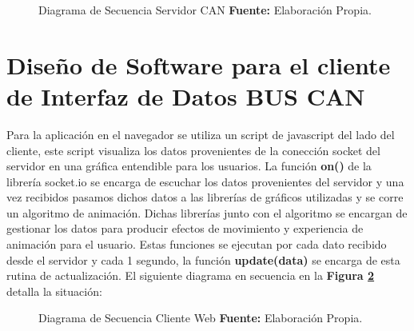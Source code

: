 
\begin{figure}[H]
	\centering
	\begin{center}
		
	\end{center}
	\caption[Diagrama de Secuencia Servidor CAN.]{Diagrama de Secuencia Servidor CAN \textbf{ Fuente:} Elaboración Propia.}
	\label{snode} %
\end{figure}





\section{Diseño de Software para el cliente de Interfaz de Datos BUS CAN}


Para la aplicación en el navegador se utiliza un script de  javascript del lado del cliente, este script visualiza los datos provenientes de la conección socket del servidor en una gráfica entendible para los usuarios. La función {\bfseries on()} de la librería socket.io se encarga de escuchar los datos provenientes del servidor y una vez recibidos pasamos dichos datos a las librerías de gráficos utilizadas y se corre un algoritmo de animación.  Dichas librerías junto con el algoritmo se encargan de gestionar los datos para producir efectos de movimiento y experiencia de animación para el usuario. Estas funciones se ejecutan por cada dato recibido desde el servidor y cada 1 segundo, la función {\bfseries update(data)} se encarga de esta rutina de actualización. 
El siguiente diagrama en secuencia en la \textbf{Figura \ref{cweb}} detalla la situación: 

\begin{figure}[H]
	\centering
	\begin{center}
		
	\end{center}
	\caption[Diagrama de Secuencia Cliente Web.]{Diagrama de Secuencia Cliente Web \textbf{ Fuente:} Elaboración Propia.}
	\label{cweb} %
\end{figure}

	


 


















